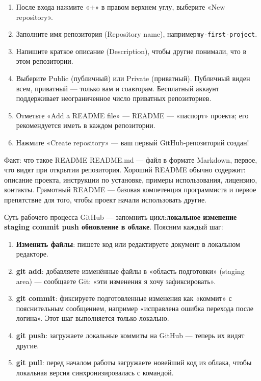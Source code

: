 
\begin{enumerate}
  \item После входа нажмите «+» в правом верхнем углу, выберите «New repository».
  \item Заполните имя репозитория (Repository name), например\texttt{my-\allowbreak first-\allowbreak project}.
  \item Напишите краткое описание (Description), чтобы другие понимали, что в этом репозитории.
  \item Выберите Public (публичный) или Private (приватный). Публичный виден всем, приватный — только вам и соавторам. Бесплатный аккаунт поддерживает неограниченное число приватных репозиториев.
  \item Отметьте «Add a README file» — README — «паспорт» проекта; его рекомендуется иметь в каждом репозитории.
  \item Нажмите «Create repository» — ваш первый GitHub-репозиторий создан!
\end{enumerate}

\begin{tcbinfo}{Факт: что такое README}
README.md — файл в формате Markdown, первое, что видят при открытии репозитория. Хороший README обычно содержит: описание проекта, инструкции по установке, примеры использования, лицензию, контакты. Грамотный README — базовая компетенция программиста и первое препятствие для того, чтобы проект начали использовать другие.

\end{tcbinfo}


Суть рабочего процесса GitHub — запомнить цикл:\textbf{локальное изменение staging commit push обновление в облаке}. Поясним каждый шаг:

\begin{enumerate}
  \item \textbf{Изменить файлы}: пишете код или редактируете документ в локальном редакторе.
  \item \textbf{git add}: добавляете изменённые файлы в «область подготовки» (staging area) — сообщаете Git: «эти изменения я хочу зафиксировать».
  \item \textbf{git commit}: фиксируете подготовленные изменения как «коммит» с пояснительным сообщением, например «исправлена ошибка перехода после логина». Этот шаг выполняется только локально.
  \item \textbf{git push}: загружаете локальные коммиты на GitHub — теперь их видят другие.
  \item \textbf{git pull}: перед началом работы загружаете новейший код из облака, чтобы локальная версия синхронизировалась с командой.
\end{enumerate}

